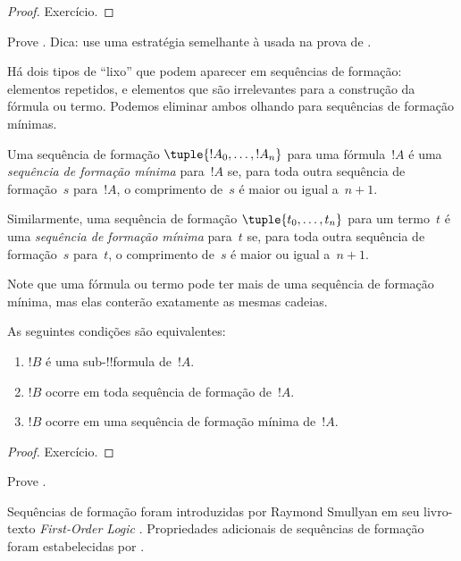\documentclass[../../../include/open-logic-section]{subfiles}
\begin{document}
\begin{proof}
Exercício.
\end{proof}

\begin{prob}
Prove .
Dica: use uma estratégia semelhante à usada na prova de
.
\end{prob}

Há dois tipos de ``lixo'' que podem aparecer em sequências de
formação: elementos repetidos, e elementos que são irrelevantes
para a construção da fórmula ou termo. Podemos eliminar
ambos olhando para sequências de formação mínimas.

\begin{defn}
Uma sequência de formação $\tuple{!A_0, \ldots, !A_n}$ para uma
fórmula~$!A$ é uma \emph{sequência de formação mínima} para~$!A$
se, para toda outra sequência de formação~$s$ para~$!A$,
o comprimento de~$s$ é maior ou igual a~$n+1$.

Similarmente, uma sequência de formação $\tuple{t_0, \ldots, t_n}$
para um termo~$t$ é uma \emph{sequência de formação mínima}
para~$t$ se, para toda outra sequência de formação~$s$ para~$t$,
o comprimento de~$s$ é maior ou igual a~$n+1$.
\end{defn}

Note que uma fórmula ou termo pode ter mais de uma sequência de formação
mínima, mas elas conterão exatamente as mesmas
cadeias.

\begin{prop}
As seguintes condições são equivalentes:
\begin{enumerate}
    \item $!B$ é uma sub-!!{formula} de~$!A$.
    \item $!B$ ocorre em toda sequência de formação de~$!A$.
    \item $!B$ ocorre em uma sequência de formação mínima de~$!A$.
\end{enumerate}
\end{prop}

\begin{proof}
Exercício.
\end{proof}

\begin{prob}
Prove .
\end{prob}

\begin{history}
Sequências de formação foram introduzidas por Raymond Smullyan em seu
livro-texto \emph{First-Order Logic} \citep{Smullyan1968}.
Propriedades adicionais de sequências de formação foram estabelecidas por
\citet{Zuckerman1973}.
\end{history}
\end{document}
